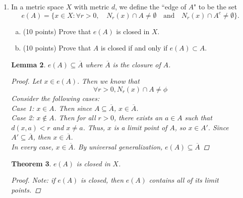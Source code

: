 \documentclass{amsart}
\newtheorem{theorem}{Theorem}
\newtheorem{lemma}[theorem]{Lemma}
\begin{document}
\begin{enumerate}[1.]
\begin{theorem}
\begin{proof}
		Assume that $A$ is countable. 
		Consider any $b \in B$. Then $f^{-1}(b) \subseteq A$ is at most countable and non-empty. Therefore, we can enumerate $f^{-1}(b)$
		as follows:
		\[
			f^{-1}(b) = \{a_{1,b}, a_{2,b}, a_{3,b}, ... \}	
		\]
		Let us construct a function $g: B \to A$ defined as follows:
		\[
			g(b) = a_{1,b}	
		\]
		We must first show that $g$ is injective.
		Consider the case where $g(b_1) = g(b_2)$ for some $b_1, b_2 \in B$. Then we know that 
		\[
			a_{1,b_1} = a_{1,b_2}
		\]
		Since $f$ is a function, $f^{-1}(b_1) \cap f^{-1}(b_2) = \phi$ (one element of the domain cannot be sent to multiple values in the range).
		Thus, the only way for $a_{1,b_1} = a_{1,b_2}$ is if $b_1 = b_2$. Thus, $g$ is injective.
		Finally, we see from Lemma 19 that, since $g: B \to A$ is injective and $A$ is countable,
		then $B$ is countable.
	\end{proof}
\end{theorem}
\newpage
\item In a metric space $X$ with metric $d$, we define the ``edge of $A$" to be the set
\[ e(A)=\{ x\in X : \forall r >0, \quad N_r(x)\cap A\neq \emptyset \quad \text{and} \quad N_r(x)\cap A^c \neq \emptyset   \}.\]
\begin{enumerate}[(a)]
	\item (10 points) Prove that $e(A)$ is closed in $X$.
	\item (10 points) Prove that $A$ is closed if and only if $e(A)\subset A$.
\end{enumerate}
\begin{lemma}
	$e(A) \subseteq \overline{A}$ where $\overline{A}$ is the closure of $A$.
	\begin{proof}
		Let $x \in e(A)$. Then we know that
		\[
			\forall r > 0, N_r(x) \cap A \neq \phi	
		\]
		Consider the following cases: \\

		Case 1: $x \in A$. Then since $A \subseteq \overline{A}$, $x \in \overline{A}$. \\
		
		Case 2: $x \notin A$. Then for all $r > 0$, there exists an $a \in A$ such that $d(x, a) < r$ and $x \neq a$.	
		Thus, $x$ is a limit point of $A$, so $x \in A'$. Since $A' \subseteq \overline{A}$, then $x \in \overline{A}$. \\
		
		In every case, $x \in \overline{A}$. By universal generalization, $e(A) \subseteq \overline{A}$
	\end{proof}	
\end{lemma}
\begin{theorem}
	$e(A)$ is closed in $X$.
	\begin{proof}
		Note: if $e(A)$ is closed, then $e(A)$ contains all of its limit points.


\end{proof}
\end{theorem}
\end{enumerate}
\end{document}
